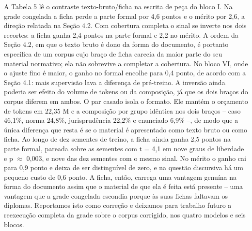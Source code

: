 \documentclass{IOS-Book-Article}
\begin{document}
A Tabela 5 lê o contraste texto-bruto/ficha na escrita de peça do bloco I. Na grade congelada a ficha perde a parte formal por 4,6 pontos e o mérito por 2,6, a direção relatada na Seção 4.2. Com cobertura completa o sinal se inverte nos dois recortes: a ficha ganha 2,4 pontos na parte formal e 2,2 no mérito. A ordem da Seção 4.2, em que o texto bruto é dono da forma do documento, é portanto específica de um corpus cujo braço de ficha carecia da maior parte do seu material normativo; ela não sobrevive a completar a cobertura. No bloco VI, onde o ajuste fino é maior, o ganho no formal encolhe para 0,4 ponto, de acordo com a Seção 4.1: mais supervisão lava a diferença de pré-treino.
A inversão ainda poderia ser efeito do volume de tokens ou da composição, já que os dois braços do corpus diferem em ambos. O par casado isola o formato. Ele mantém o orçamento de tokens em 22,35 M e a composição por grupo idêntica nos dois braços -- caso 46,1\%, norma 24,8\%, jurisprudência 22,2\% e enunciado 6,9\% --, de modo que a única diferença que resta é se o material é apresentado como texto bruto ou como ficha. Ao longo de dez sementes de treino, a ficha ainda ganha 2,5 pontos na parte formal, pareada sobre as sementes com t = 4,1 em nove graus de liberdade e p $\approx$ 0,003, e nove das dez sementes com o mesmo sinal. No mérito o ganho cai para 0,9 ponto e deixa de ser distinguível de zero, e na questão discursiva há um pequeno custo de 0,6 ponto. A ficha, então, carrega uma vantagem genuína na forma do documento assim que o material de que ela é feita está presente -- uma vantagem que a grade congelada escondia porque às suas fichas faltavam os diplomas. Reportamos isto como correção e deixamos para trabalho futuro a reexecução completa da grade sobre o corpus corrigido, nos quatro modelos e seis blocos.
\end{document}
